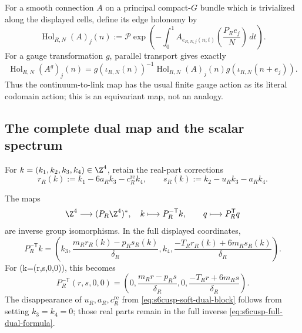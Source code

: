 For a smooth connection \(A\) on a principal compact-\(G\) bundle which is
trivialized along the displayed cells, define its edge holonomy by
\begin{equation}\label{eq:s6cusp-holonomy-map}
 \operatorname{Hol}_{R,N}(A)_j(n):=
 \mathcal P\exp\!\left(
 -\int_0^1A_{e_{R,N,j}(n;t)}
 \left(\frac{P_Re_j}{N}\right)\,dt\right).
\end{equation}
For a gauge transformation \(g\), parallel transport gives exactly
\begin{equation}\label{eq:s6cusp-holonomy-gauge-equivariance}
 \operatorname{Hol}_{R,N}(A^g)_j(n)
 =g(\iota_{R,N}(n))^{-1}\operatorname{Hol}_{R,N}(A)_j(n)
 g(\iota_{R,N}(n+e_j)).
\end{equation}
Thus the continuum-to-link map has the usual finite gauge action as its
literal codomain action; this is an equivariant map, not an analogy.

\subsection{The complete dual map and the scalar spectrum}

For \(k=(k_1,k_2,k_3,k_4)\in\Z^4\), retain the real-part corrections
\begin{equation}\label{eq:s6cusp-adjusted-dual-integers}
 r_R(k):=k_1-6a_Rk_3-c_R^{\mathrm{re}}k_4,\qquad
 s_R(k):=k_2-u_Rk_3-a_Rk_4.
\end{equation}

\begin{theorem}
\label{thm:s6cusp-dual-isomorphism}
The maps
\begin{equation}\label{eq:s6cusp-dual-maps}
 \Z^4\longrightarrow(P_R\Z^4)^*,\quad
 k\longmapsto P_R^{-\mathsf T}k,\qquad
 q\longmapsto P_R^{\mathsf T}q
\end{equation}
are inverse group isomorphisms.  In the full displayed coordinates,
\begin{equation}\label{eq:s6cusp-full-dual-formula}
 P_R^{-\mathsf T}k=
 \left(
 k_3,
 \frac{m_Rr_R(k)-p_Rs_R(k)}{\delta_R},
 k_4,
 \frac{-T_Rr_R(k)+6m_Rs_R(k)}{\delta_R}
 \right).
\end{equation}
For (k=(r,s,0,0)), this becomes
\begin{equation}\label{eq:s6cusp-soft-dual-block}
 P_R^{-\mathsf T}(r,s,0,0)=
 \left(0,\frac{m_Rr-p_Rs}{\delta_R},0,
 \frac{-T_Rr+6m_Rs}{\delta_R}\right).
\end{equation}
The disappearance of \(u_R,a_R,c_R^{\mathrm{re}}\) from
\eqref{eq:s6cusp-soft-dual-block} follows from setting \(k_3=k_4=0\);
those real parts remain in the full inverse
\eqref{eq:s6cusp-full-dual-formula}.
\end{theorem}

